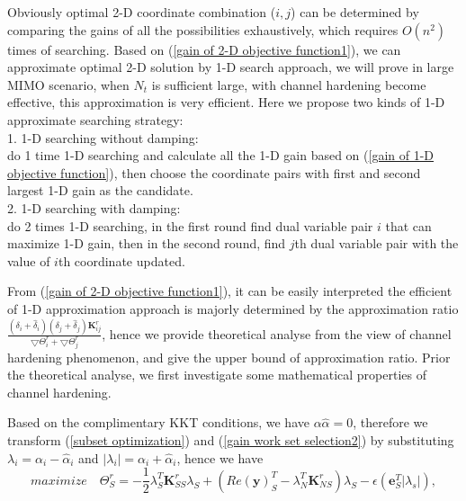 \documentclass[12pt, draftclsnofoot, onecolumn]{IEEEtran}
\begin{document}
\begin{spacing}{2}
Obviously optimal 2-D coordinate combination ($i, j$) can be determined by comparing the gains of all the possibilities exhaustively, which requires $O(n^{2})$ times of searching. Based on (\ref{gain of 2-D objective function1}), we can approximate optimal 2-D solution by 1-D search approach, we will prove in large MIMO scenario, when $N_{t}$ is sufficient large, with channel hardening become effective, this approximation is very efficient. Here we propose two kinds of 1-D approximate searching strategy:\\
1. 1-D searching without damping:\\
do 1 time 1-D searching and calculate all the 1-D gain based on (\ref{gain of 1-D objective function}), then choose the coordinate pairs with first and second largest 1-D gain as the candidate.\\
2. 1-D searching with damping:\\
do 2 times 1-D searching, in the first round find dual variable pair $i$ that can maximize 1-D gain, then in the second round, find $j$th dual variable pair with the value of $i$th coordinate updated.

From (\ref{gain of 2-D objective function1}), it can be easily interpreted the efficient of 1-D approximation approach is majorly determined by the approximation ratio $\frac{(\delta_{i}+\hat{\delta}_{i})(\delta_{j}+\hat{\delta}_{j})\mathbf{K}^{r}_{ij}}{\bigtriangledown \Theta^{r}_{i}+\bigtriangledown \Theta^{r}_{j}}$, hence we provide theoretical analyse from the view of channel hardening phenomenon, and give the upper bound of approximation ratio. Prior the theoretical analyse, we first investigate some mathematical properties of channel hardening.    

 Based on the complimentary KKT conditions, we have $\alpha\hat{\alpha}=0$, therefore we transform (\ref{subset optimization}) and (\ref{gain work set selection2}) by substituting $\lambda_{i}=\alpha_{i}-\hat{\alpha}_{i}$ and $|\lambda_{i}|=\alpha_{i}+\hat{\alpha}_{i}$, hence we have 
\begin{equation}
maximize\quad \Theta_{S}^{r}=-\frac{1}{2}\lambda_{S}^{T}\mathbf{K}_{SS}^{r}\lambda_{S}+(Re(\mathbf{y})_{S}^{T}-\lambda_{N}^{T}\mathbf{K}_{NS}^{r}
)\lambda_{S}-\epsilon(\mathbf{e}_{S}^{T}|\lambda_{s}|),
\label{simplified subset optimization}
\end{equation}



\end{spacing}
\end{document}
